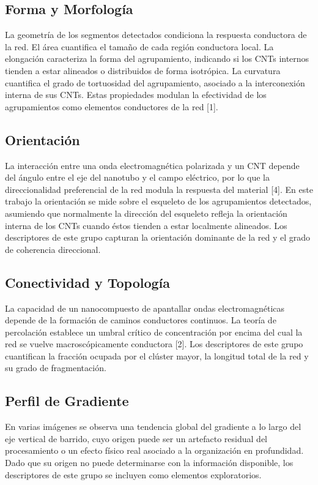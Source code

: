 \subsection{Forma y Morfología}
La geometría de los segmentos detectados condiciona la respuesta conductora de la red. El área cuantifica el tamaño de cada región conductora local. La elongación caracteriza la forma del agrupamiento, indicando si los CNTs internos tienden a estar alineados o distribuidos de forma isotrópica. La curvatura cuantifica el grado de tortuosidad del agrupamiento, asociado a la interconexión interna de sus CNTs. Estas propiedades modulan la efectividad de los agrupamientos como elementos conductores de la red [1].

\subsection{Orientación}
La interacción entre una onda electromagnética polarizada y un CNT depende del ángulo entre el eje del nanotubo y el campo eléctrico, por lo que la direccionalidad preferencial de la red modula la respuesta del material [4]. En este trabajo la orientación se mide sobre el esqueleto de los agrupamientos detectados, asumiendo que normalmente la dirección del esqueleto refleja la orientación interna de los CNTs cuando éstos tienden a estar localmente alineados. Los descriptores de este grupo capturan la orientación dominante de la red y el grado de coherencia direccional.

\subsection{Conectividad y Topología}
La capacidad de un nanocompuesto de apantallar ondas electromagnéticas depende de la formación de caminos conductores continuos. La teoría de percolación establece un umbral crítico de concentración por encima del cual la red se vuelve macroscópicamente conductora [2]. Los descriptores de este grupo cuantifican la fracción ocupada por el clúster mayor, la longitud total de la red y su grado de fragmentación.

\subsection{Perfil de Gradiente}
En varias imágenes se observa una tendencia global del gradiente a lo largo del eje vertical de barrido, cuyo origen puede ser un artefacto residual del procesamiento o un efecto físico real asociado a la organización en profundidad. Dado que su origen no puede determinarse con la información disponible, los descriptores de este grupo se incluyen como elementos exploratorios.

